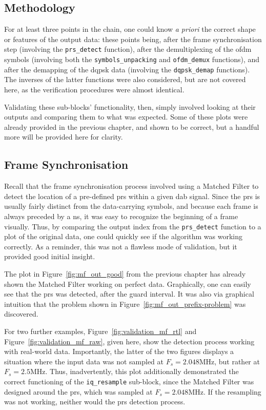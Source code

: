 \documentclass[class=report,11pt,crop=false]{standalone}
\begin{document}
\subsection{Methodology}
For at least three points in the chain, one could know \emph{a priori} the correct shape or features of the output data: these points being, after the frame synchronisation step (involving the \texttt{prs\_detect} function), after the demultiplexing of the \gls{ofdm} symbols (involving both the \texttt{symbols\_unpacking} and \texttt{ofdm\_demux} functions), and after the demapping of the \gls{dqpsk} data (involving the \texttt{dqpsk\_demap} functions). The inverses of the latter functions were also considered, but are not covered here, as the verification procedures were almost identical.

Validating these sub-blocks' functionality, then, simply involved looking at their outputs and comparing them to what was expected. Some of these plots were already provided in the previous chapter, and shown to be correct, but a handful more will be provided here for clarity.

\subsection{Frame Synchronisation}
Recall that the frame synchronisation process involved using a Matched Filter to detect the location of a pre-defined \gls{prs} within a given \gls{dab} signal. Since the \gls{prs} is usually fairly distinct from the data-carrying symbols, and because each frame is always preceded by a \gls{ns}, it was easy to recognize the beginning of a frame visually. Thus, by comparing the output index from the \texttt{prs\_detect} function to a plot of the original data, one could quickly see if the algorithm was working correctly. As a reminder, this was not a flawless mode of validation, but it provided good initial insight.

The plot in Figure~\ref{fig:mf_out_good} from the previous chapter has already shown the Matched Filter working on perfect data. Graphically, one can easily see that the \gls{prs} was detected, after the guard interval. It was also via graphical intuition that the problem shown in Figure~\ref{fig:mf_out_prefix-problem} was discovered.

For two further examples, Figure~\ref{fig:validation_mf_rtl} and Figure~\ref{fig:validation_mf_raw}, given here, show the detection process working with real-world data. Importantly, the latter of the two figures displays a situation where the input data was not sampled at \(F_s = 2.048\si{\mega\hertz}\), but rather at \(F_s = 2.5\si{\mega\hertz}\). Thus, inadvertently, this plot additionally demonstrated the correct functioning of the \texttt{iq\_resample} sub-block, since the Matched Filter was designed around the \gls{prs}, which was sampled at \(F_s = 2.048\si{\mega\hertz}\). If the resampling was not working, neither would the \gls{prs} detection process.
\end{document}
